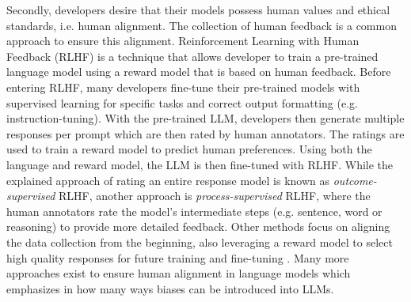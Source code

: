 \par Secondly, developers desire that their models possess human values and ethical standards, i.e. human alignment. The collection of human feedback is a common approach to ensure this alignment. Reinforcement Learning with Human Feedback (RLHF) is a technique that allows developer to train a pre-trained language model using a reward model that is based on human feedback. Before entering RLHF, many developers fine-tune their pre-trained models with supervised learning for specific tasks and correct output formatting (e.g. instruction-tuning). With the pre-trained LLM, developers then generate multiple responses per prompt which are then rated by human annotators. The ratings are used to train a reward model to predict human preferences. Using both the language and reward model, the LLM is then fine-tuned with RLHF. While the explained approach of rating an entire response model is known as \textit{outcome-supervised} RLHF, another approach is \textit{process-supervised} RLHF, where the human annotators rate the model's intermediate steps (e.g. sentence, word or reasoning) to provide more detailed feedback. Other methods focus on aligning the data collection from the beginning, also leveraging a reward model to select high quality responses for future training and fine-tuning \parencite{ouyang2022training, zhao2023survey}. Many more approaches exist to ensure human alignment in language models which emphasizes in how many ways biases can be introduced into LLMs.

